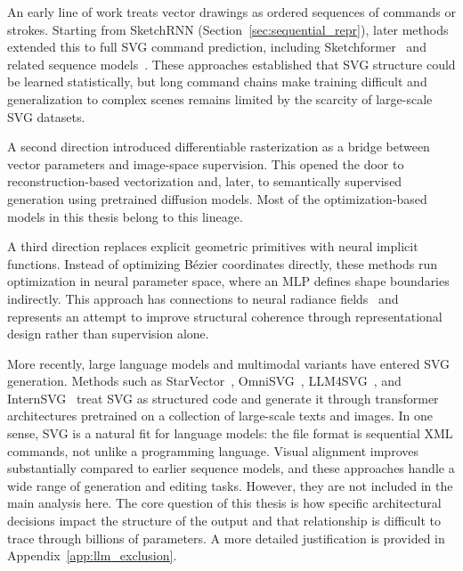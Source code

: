 An early line of work treats vector drawings as ordered 
sequences of commands or strokes. Starting from 
SketchRNN (Section~\ref{sec:sequential_repr}), later 
methods extended this to full SVG command prediction, 
including 
Sketchformer~\cite{ribeiroSketchformerTransformerbasedRepresentation2020} 
and related sequence 
models~\cite{ganinSynthesizingProgramsImages2018, 
lopesLearnedRepresentationScalable2019b}. These approaches 
established that SVG structure could be learned 
statistically, but long command chains make training 
difficult and generalization to complex scenes remains 
limited by the scarcity of large-scale SVG datasets.

A second direction introduced differentiable rasterization as
a bridge between vector parameters and image-space supervision.
This opened the door to reconstruction-based
vectorization and, later, to semantically supervised generation
using pretrained diffusion models. Most of the optimization-based
models in this thesis belong to this lineage.

A third direction replaces explicit geometric primitives with
neural implicit functions. Instead of optimizing Bézier
coordinates directly, these methods run optimization in neural
parameter space, where an MLP defines shape boundaries
indirectly. This approach has connections to neural radiance
fields~\cite{mildenhallNeRFRepresentingScenes2020} and
represents an attempt to improve structural coherence through
representational design rather than supervision alone.

More recently, large language models and multimodal variants
have entered SVG generation. Methods such as
StarVector~\cite{rodriguezStarVectorGeneratingScalable2025},
OmniSVG~\cite{yangOmniSVGUnifiedScalable2025},
LLM4SVG~\cite{xingEmpoweringLLMsUnderstand2025}, and
InternSVG~\cite{wangInternSVGUnifiedSVG2025} treat SVG as
structured code and generate it through transformer
architectures pretrained on a collection of large-scale texts and images. 
In one sense, SVG is a natural fit for language
models: the file format is sequential XML commands, not
unlike a programming language. Visual alignment improves
substantially compared to earlier sequence models, and
these approaches handle a wide range of generation and
editing tasks. However, they are not included in the main
analysis here. The core question of this thesis is how
specific architectural decisions impact the structure
of the output and that relationship is difficult to
trace through billions of parameters. A more detailed
justification is provided in Appendix~\ref{app:llm_exclusion}.

